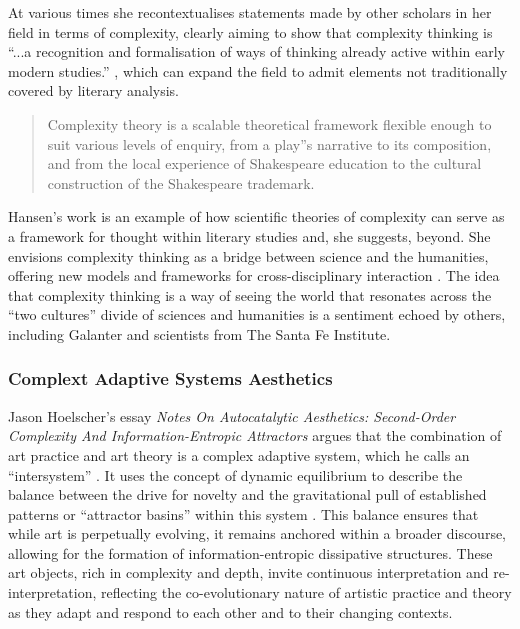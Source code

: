                 At various times she recontextualises statements made by other scholars in her field in terms of complexity, clearly aiming to show that complexity thinking is “...a recognition and formalisation of ways of thinking already active within early modern studies.” \citep[p.32]{HansenShksprAndCmplxtyThry2017}, which can expand the field to admit elements not traditionally covered by literary analysis.

                \begin{quote}
                    Complexity theory is a scalable theoretical framework flexible enough to suit various levels of enquiry, from a play”s narrative to its composition, and from the local experience of Shakespeare education to the cultural construction of the Shakespeare trademark. \citep[p.199]{HansenShksprAndCmplxtyThry2017}
                \end{quote}

                Hansen's work is an example of how scientific theories of complexity can serve as a framework for thought within literary studies and, she suggests, beyond. She envisions complexity thinking as a bridge between science and the humanities, offering new models and frameworks for cross-disciplinary interaction \citep[p.200]{HansenShksprAndCmplxtyThry2017}. The idea that complexity thinking is a way of seeing the world that resonates across the “two cultures” divide of sciences and humanities \citep{SnowThTwCltrs1959} is a sentiment echoed by others, including Galanter\citep{GalanterShtByBthSds2011} and scientists from The Santa Fe Institute\citep{CowanMnhttnPrjctTThSntFInstt2010}.

            \subsubsection{Complext Adaptive Systems Aesthetics}\label{sec:ComplexAdaptiveSystemsAesthetics}

                Jason Hoelscher's essay \emph{Notes On Autocatalytic Aesthetics: Second-Order Complexity And Information-Entropic Attractors} \citep[pp.27-49]{HoelscherNtsOnAtctlytcAsthtcs2015} argues that the combination of art practice and art theory is a complex adaptive system, which he calls an “intersystem” \citep[p.38]{HoelscherNtsOnAtctlytcAsthtcs2015}. It uses the concept of dynamic equilibrium to describe the balance between the drive for novelty and the gravitational pull of established patterns or “attractor basins” within this system \citep[pp.41-42]{HoelscherNtsOnAtctlytcAsthtcs2015}. This balance ensures that while art is perpetually evolving, it remains anchored within a broader discourse, allowing for the formation of information-entropic dissipative structures. These art objects, rich in complexity and depth, invite continuous interpretation and re-interpretation, reflecting the co-evolutionary nature of artistic practice and theory as they adapt and respond to each other and to their changing contexts. 
                
